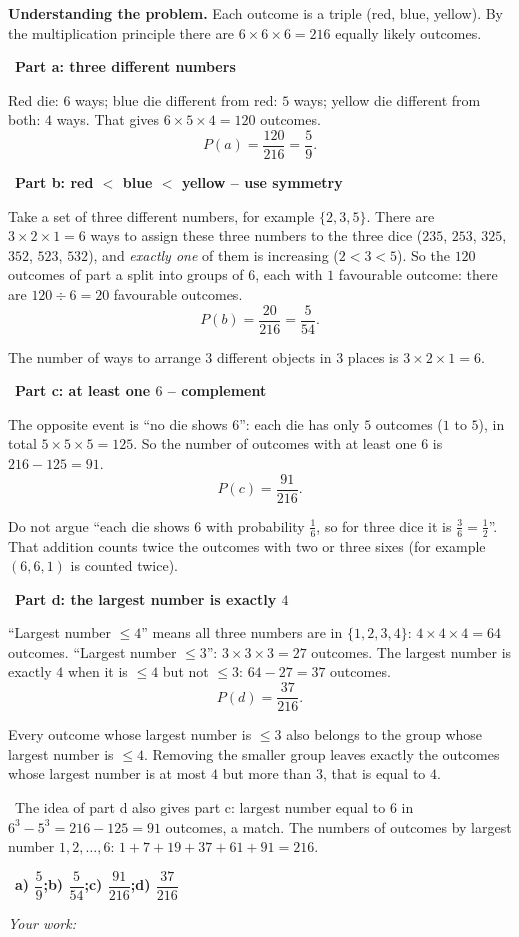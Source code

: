 \documentclass[11pt]{article}
\newif\ifsol \solfalse
\providecommand{\AnsWord}{Đáp số}
\newcommand{\ans}[1]{\par\smallskip{\bfseries\color{tmGreen!88!black}\AnsWord:}\ {\bfseries\color{AnsRed}#1}\par}
\newcommand{\probsol}[1]{%
  \begin{lrbox}{\solmeasure}\begin{minipage}{\dimexpr\linewidth-24pt\relax}#1\end{minipage}\end{lrbox}%
  \ifsol
    \begin{solbox}#1\end{solbox}%
  \else
    \setlength{\solht}{\dimexpr\ht\solmeasure+\dp\solmeasure+0.85cm\relax}%
    \ifdim\solht<1.35cm\setlength{\solht}{1.35cm}\fi
    \ifdim\solht>\StudentMaxWork\setlength{\solht}{\StudentMaxWork}\fi
    \begin{tcolorbox}[colback=white,colframe=Line,boxrule=0.8pt,arc=5pt,
      left=8pt,right=8pt,top=4pt,bottom=4pt,height=\solht]{\footnotesize\color{Slate}\itshape\WorkWord}\end{tcolorbox}%
  \fi}
\newlength{\StudentMaxWork}\setlength{\StudentMaxWork}{7.5cm}
\newcommand{\step}[2]{\par\smallskip\noindent{\bfseries\color{tmBlue!85!black}\StepWord~#1.}\ {\bfseries #2}\par\nopagebreak}
\newcommand{\verify}[1]{\par\smallskip\noindent{\bfseries\color{tmGreen!80!black}\faCheckCircle\ \CheckWord}\ #1\par}
\def\WorkWord{Your work:}
\def\AnsWord{Answer}
\def\StepWord{Step}
\def\CheckWord{Check:}
\begin{document}
\probsol{
\textbf{Understanding the problem.} Each outcome is a triple (red, blue, yellow). By the multiplication principle there are
$6\times6\times6=216$ equally likely outcomes.

\step{1}{Part a: three different numbers}
Red die: $6$ ways; blue die different from red: $5$ ways; yellow die different from both: $4$ ways. That gives $6\times5\times4=120$ outcomes.
\[P(a)=\frac{120}{216}=\frac{5}{9}.\]

\step{2}{Part b: red $<$ blue $<$ yellow -- use symmetry}
Take a set of three different numbers, for example $\{2,3,5\}$. There are $3\times2\times1=6$ ways to assign these three numbers to the three
dice ($235$, $253$, $325$, $352$, $523$, $532$), and \emph{exactly one} of them is increasing ($2<3<5$).
So the $120$ outcomes of part a split into groups of $6$, each with $1$ favourable outcome: there are $120\div6=20$ favourable outcomes.
\[P(b)=\frac{20}{216}=\frac{5}{54}.\]
\begin{recallbox}The number of ways to arrange $3$ different objects in $3$ places is $3\times2\times1=6$.\end{recallbox}

\step{3}{Part c: at least one $6$ -- complement}
The opposite event is ``no die shows $6$'': each die has only $5$ outcomes ($1$ to $5$), in total $5\times5\times5=125$.
So the number of outcomes with at least one $6$ is $216-125=91$.
\[P(c)=\frac{91}{216}.\]
\begin{warnbox}Do not argue ``each die shows $6$ with probability $\frac16$, so for three dice it is $\frac36=\frac12$''. That addition counts
twice the outcomes with two or three sixes (for example $(6,6,1)$ is counted twice).\end{warnbox}

\step{4}{Part d: the largest number is exactly $4$}
``Largest number $\le4$'' means all three numbers are in $\{1,2,3,4\}$: $4\times4\times4=64$ outcomes.
``Largest number $\le3$'': $3\times3\times3=27$ outcomes. The largest number is exactly $4$ when it is $\le4$ but not $\le3$:
$64-27=37$ outcomes.
\[P(d)=\frac{37}{216}.\]
\begin{proofbox}Every outcome whose largest number is $\le3$ also belongs to the group whose largest number is $\le4$. Removing the smaller
group leaves exactly the outcomes whose largest number is at most $4$ but more than $3$, that is equal to $4$.\end{proofbox}
\verify{The idea of part d also gives part c: largest number equal to $6$ in $6^3-5^3=216-125=91$ outcomes, a match. The numbers of
outcomes by largest number $1,2,\dots,6$: $1+7+19+37+61+91=216$.}
\ans{a) $\dfrac59$;\quad b) $\dfrac5{54}$;\quad c) $\dfrac{91}{216}$;\quad d) $\dfrac{37}{216}$}
}
\end{document}
